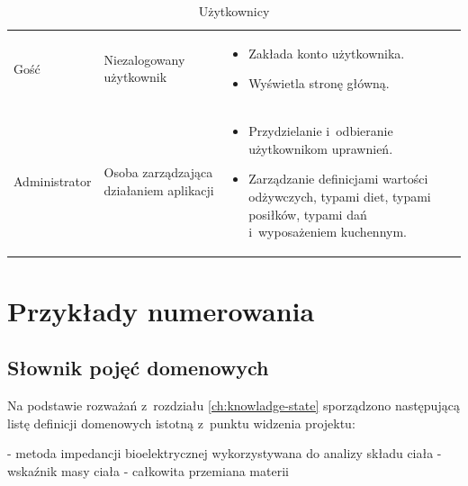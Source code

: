 \begin{minipage}{\textwidth}
    \begin{table}[H]
        \centering\caption{Użytkownicy \source{\ownwork}\label{tabela:uzytkownicy}}
        \begin{tabular}{|P{.15\textwidth}|P{.25\textwidth}|P{.5\textwidth}|}

            \hline
             &  & \\

            \hline
            Gość &
            Niezalogowany użytkownik &
            \begin{itemize}
                \item Zakłada konto użytkownika.
                \item Wyświetla stronę główną.
            \end{itemize} \\
            \hline
            Administrator &
            Osoba zarządzająca działaniem aplikacji &
            \begin{itemize}
                \item Przydzielanie i~odbieranie użytkownikom uprawnień.
                \item Zarządzanie definicjami wartości odżywczych, typami diet, typami posiłków, typami dań i~wyposażeniem kuchennym.
            \end{itemize} \\
            \hline
        \end{tabular}
    \end{table}
\end{minipage}

\section{Przykłady numerowania}
\subsection{Słownik pojęć domenowych}\label{sec:dictionary}
Na podstawie rozważań z~rozdziału \ref{ch:knowladge-state} sporządzono następującą listę definicji domenowych istotną z~punktu widzenia projektu:
\begin{itemize}[series=atr, wide, align=left, leftmargin=190pt]
    - metoda impedancji bioelektrycznej wykorzystywana do analizy składu ciała
    - wskaźnik masy ciała
    - całkowita przemiana materii
\end{itemize}
